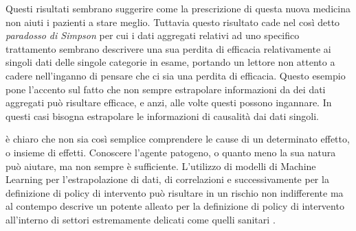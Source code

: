 Questi risultati sembrano suggerire come la prescrizione 
di questa nuova medicina non aiuti i pazienti a stare meglio.
Tuttavia questo risultato cade nel così detto \emph{paradosso di Simpson}
\cite{wiki:Simpson's_paradox} per cui i dati aggregati relativi 
ad uno specifico trattamento sembrano descrivere una sua 
perdita di efficacia relativamente ai singoli dati delle 
singole categorie in esame, portando un lettore non attento 
a cadere nell'inganno di pensare che ci sia una perdita di 
efficacia. Questo esempio pone l'accento sul fatto che non sempre
estrapolare informazioni da dei dati aggregati può risultare
efficace, e anzi, alle volte questi possono ingannare.
In questi casi bisogna estrapolare le informazioni di 
causalità dai dati singoli.

è chiaro che non sia così semplice comprendere le cause 
di un determinato effetto, o insieme di effetti. Conoscere
l'agente patogeno, o quanto meno la sua natura può aiutare,
ma non sempre è sufficiente. L'utilizzo di modelli di 
Machine Learning per l'estrapolazione di dati, di correlazioni
e successivamente per la definizione di policy di intervento
può risultare in un rischio non indifferente ma al contempo 
descrive un potente alleato per la definizione di policy di 
intervento all'interno di settori estremamente delicati come 
quelli sanitari \cite{doi:10.1098/rsos.220638}.